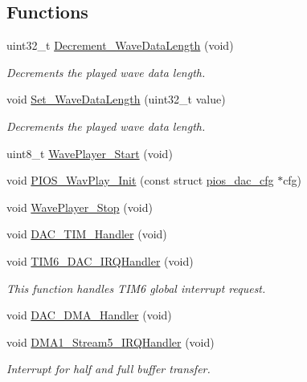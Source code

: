 \subsection*{\-Functions}
\begin{DoxyCompactItemize}
\item 
uint32\-\_\-t \hyperlink{group___w_a_v_e_p_l_a_y_e_r___private___variables_ga320f95ce300a40d4d6ac9330571b69f5}{\-Decrement\-\_\-\-Wave\-Data\-Length} (void)
\begin{DoxyCompactList}\small\item\em \-Decrements the played wave data length. \end{DoxyCompactList}\item 
void \hyperlink{group___w_a_v_e_p_l_a_y_e_r___private___variables_ga06d4df1b9aa3d4d9b1917165d566fa6e}{\-Set\-\_\-\-Wave\-Data\-Length} (uint32\-\_\-t value)
\begin{DoxyCompactList}\small\item\em \-Decrements the played wave data length. \end{DoxyCompactList}\item 
uint8\-\_\-t \hyperlink{group___w_a_v_e_p_l_a_y_e_r___private___variables_gad653a67ad3415d1d9d9c91e13904fb06}{\-Wave\-Player\-\_\-\-Start} (void)
\item 
void \hyperlink{group___w_a_v_e_p_l_a_y_e_r___private___variables_ga833570d033bad7d2098b024caec552be}{\-P\-I\-O\-S\-\_\-\-Wav\-Play\-\_\-\-Init} (const struct \hyperlink{structpios__dac__cfg}{pios\-\_\-dac\-\_\-cfg} $\ast$cfg)
\item 
void \hyperlink{group___w_a_v_e_p_l_a_y_e_r___private___variables_ga29135d928d42113c2b530dbb74b16ecb}{\-Wave\-Player\-\_\-\-Stop} (void)
\item 
void \hyperlink{group___w_a_v_e_p_l_a_y_e_r___private___variables_gaea75313b54903975f2fdc7544db2be56}{\-D\-A\-C\-\_\-\-T\-I\-M\-\_\-\-Handler} (void)
\item 
void \hyperlink{group___w_a_v_e_p_l_a_y_e_r___private___variables_ga0839a45f331c4c067939b9c4533bbf4d}{\-T\-I\-M6\-\_\-\-D\-A\-C\-\_\-\-I\-R\-Q\-Handler} (void)
\begin{DoxyCompactList}\small\item\em \-This function handles \-T\-I\-M6 global interrupt request. \end{DoxyCompactList}\item 
void \hyperlink{group___w_a_v_e_p_l_a_y_e_r___private___variables_gacd70b474635a5b775308867bd730d64d}{\-D\-A\-C\-\_\-\-D\-M\-A\-\_\-\-Handler} (void)
\item 
void \hyperlink{group___w_a_v_e_p_l_a_y_e_r___private___variables_gac201b60d58b0eba2ce0b55710eb3c4d0}{\-D\-M\-A1\-\_\-\-Stream5\-\_\-\-I\-R\-Q\-Handler} (void)
\begin{DoxyCompactList}\small\item\em \-Interrupt for half and full buffer transfer. \end{DoxyCompactList}\end{DoxyCompactItemize}

